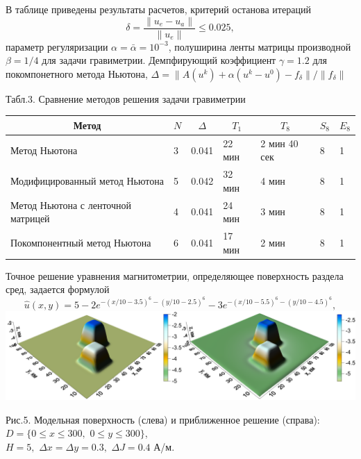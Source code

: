 \documentclass[10pt,pdf, mathserif, hyperref={unicode}]{beamer}
\begin{document}
\begin{frame}
	В таблице приведены результаты расчетов, критерий останова итераций 
	$$\delta=\frac{\|u_e-u_a\|}{\|u_e\|}\le 0.025,$$ параметр регуляризации $\alpha=\bar{\alpha}=10^{-3}$, полуширина ленты матрицы производной $\beta=1/4$ для задачи гравиметрии. Демпфирующий коэффициент $\gamma=1.2$ для покомпонетного метода Ньютона, $\Delta=\|A(u^k)+\alpha(u^k-u^0)-f_\delta\|/\|f_\delta\|$
	
	\begin{table}[]
		\centering
		\renewcommand{\arraystretch}{1.5}
		\scriptsize{Табл.3. Сравнение методов решения задачи гравиметрии}
		\label{table3.1}
		\begin{tabular}{|p{}|p{}|l|l|l|l|l|}
			\hline
			\multicolumn{1}{|c|}{Метод}        & \multicolumn{1}{c|}{$N$} &
			\multicolumn{1}{c|}{$\Delta$} & \multicolumn{1}{c|}{$T_1$} & \multicolumn{1}{c|}{$T_8$} &
			\multicolumn{1}{c|}{$S_8$} & \multicolumn{1}{c|}{$E_8$}
			\\ \hline
			Метод Ньютона                      &  3        & 0.041                          &       22 мин                  &     2 мин 40 сек &
			8 & 1 \\ \hline
			Модифицированный метод Ньютона     &         5           & 0.042            & 32 мин                  & 4 мин      &
			8 & 1             \\ \hline
			Метод Ньютона с ленточной матрицей &  4               & 0.041                    & 24 мин                  & 3 мин       & 8 & 1            \\ \hline
			Покомпонентный метод Ньютона &  6               & 0.041                    & 17 мин                  & 2 мин       & 8 & 1            \\ \hline
		\end{tabular}
	\end{table}
\end{frame}
\begin{frame}
	Точное решение уравнения магнитометрии, определяющее поверхность раздела сред, задается формулой
	$$\hat{u}(x,y)=5-2e^{-(x/10-3.5)^6-(y/10-2.5)^6}-3e^{-(x/10-5.5)^6-(y/10-4.5)^6},$$
	\centering
	\includegraphics[width=\textwidth, height=0.3\textheight]{magne_kiev2014.png}
	
	Рис.5. Модельная поверхность (слева) и приближенное решение (справа): $D=\{0\le x\le 300, \,\,0\le y\le 300\}$, \\ $  H=5,\,\,\Delta x=\Delta y=0.3,\,\,\Delta J=0.4$ А/м.
\end{frame}
\end{document}

